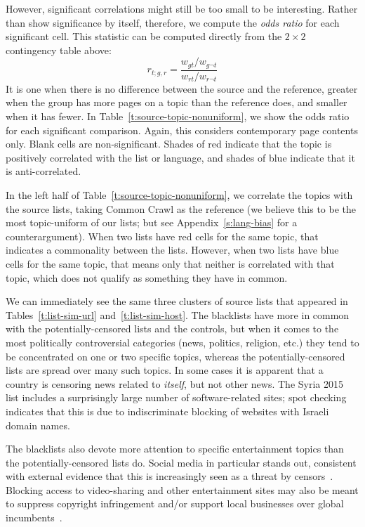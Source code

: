 However, significant correlations might still be too small to be
interesting.  Rather than show significance by itself, therefore, we
compute the \emph{odds ratio} for each significant cell.  This
statistic can be computed directly from the $2\times2$ contingency
table above:
\begin{equation}\label{e:odds-ratio}
r_{t;g,r} = \frac{w_{gt}/w_{g\neg t}}{w_{rt}/w_{r\neg t}}
\end{equation}
It is one when there is no difference between the source and the
reference, greater when the group has more pages on a topic than the
reference does, and smaller when it has fewer.  In
Table~\ref{t:source-topic-nonuniform}, we show the odds ratio for each
significant comparison.  Again, this considers contemporary page
contents only.  Blank cells are non-significant.  Shades of red
indicate that the topic is positively correlated with the list or
language, and shades of blue indicate that it is anti-correlated.

In the left half of Table~\ref{t:source-topic-nonuniform}, we
correlate the topics with the source lists, taking Common Crawl as the
reference (we believe this to be the most topic-uniform of our lists;
but see Appendix~\ref{s:lang-bias} for a counterargument).  When two
lists have red cells for the same topic, that indicates a commonality
between the lists.  However, when two lists have blue cells for the
same topic, that means only that neither is correlated with that
topic, which does not qualify as something they have in common.

We can immediately see the same three clusters of source lists that
appeared in Tables~\ref{t:list-sim-url} and~\ref{t:list-sim-host}.
The blacklists have more in common with the potentially-censored lists
and the controls, but when it comes to the most politically
controversial categories (news, politics, religion, etc.) they tend to
be concentrated on one or two specific topics, whereas the
potentially-censored lists are spread over many such topics.  In some
cases it is apparent that a country is censoring news related to
\emph{itself}, but not other news.  The Syria 2015 list includes a
surprisingly large number of software-related sites; spot checking
indicates that this is due to indiscriminate blocking of websites
with Israeli domain names.

The blacklists also devote more attention to specific entertainment
topics than the potentially-censored lists do.  Social media in
particular stands out, consistent with external evidence that this is
increasingly seen as a threat by censors~\cite{oni2011contested}.
Blocking access to video-sharing and other entertainment sites may
also be meant to suppress copyright infringement and/or support local
businesses over global incumbents~\cite{khattak.2014.isp}.

